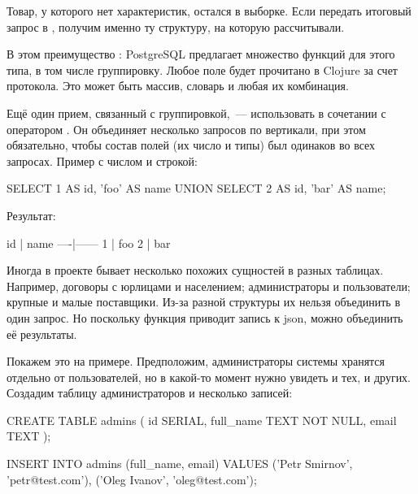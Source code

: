 Товар, у которого нет характеристик, остался в выборке. Если передать итоговый запрос в , получим именно ту структуру, на которую рассчитывали.

В этом преимущество : PostgreSQL предлагает множество функций для этого типа, в том числе группировку. Любое поле  будет прочитано в Clojure за счет протокола. Это может быть массив, словарь и любая их комбинация.

Ещё один прием, связанный с группировкой,~--- использовать  в сочетании с оператором . Он объединяет несколько запросов по вертикали, при этом обязательно, чтобы состав полей (их число и типы) был одинаков во всех запросах. Пример с числом и строкой:

\begin{english}
  \begin{sql}
SELECT
  1 AS id, 'foo' AS name
UNION
SELECT
  2 AS id, 'bar' AS name;
  \end{sql}
\end{english}

Результат:

\begin{english}
  \begin{text}
 id | name
----|------
  1 | foo
  2 | bar
  \end{text}
\end{english}

Иногда в проекте бывает несколько похожих сущностей в разных таблицах. Например, договоры с юрлицами и населением; администраторы и пользователи; крупные и малые поставщики. Из-за разной структуры их нельзя объединить в один запрос. Но поскольку функция  приводит запись к json, можно объединить её результаты.

Покажем это на примере. Предположим, администраторы системы хранятся отдельно от пользователей, но в какой-то момент нужно увидеть и тех, и других. Создадим таблицу администраторов и несколько записей:

\begin{english}
  \begin{sql}
CREATE TABLE admins (
  id SERIAL,
  full_name TEXT NOT NULL,
  email TEXT
);

INSERT INTO admins (full_name, email)
VALUES ('Petr Smirnov', 'petr@test.com'),
       ('Oleg Ivanov', 'oleg@test.com');
  \end{sql}
\end{english}

